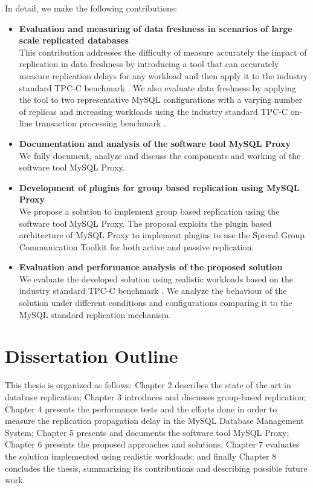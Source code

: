 In detail, we make the following contributions:

\begin{itemize}
	\item \textbf{Evaluation and measuring of data freshness in scenarios of large scale replicated databases}\\
		This contribution addresses the difficulty of measure accurately the impact of replication in data freshness by introducing a tool that can accurately measure replication delays for any workload and then apply it to the industry standard TPC-C benchmark \cite{Cou01}. We also evaluate data freshness by applying the tool to two representative MySQL configurations with a varying number of replicas and increasing workloads using the industry standard TPC-C on-line transaction processing benchmark \cite{Cou01}.
		
	\item \textbf{Documentation and analysis of the software tool MySQL Proxy}\\
		We fully document, analyze and discuss the components and working of the software tool MySQL Proxy.
		
	\item \textbf{Development of plugins for group based replication using MySQL Proxy}\\
		We propose a solution to implement group based replication using the software tool MySQL Proxy. The proposal exploits the plugin based architecture of MySQL Proxy to implement plugins to use the Spread Group Communication Toolkit for both active and passive replication.
		
	\item \textbf{Evaluation and performance analysis of the proposed solution}\\
		We evaluate the developed solution using realistic workloads based on the industry standard TPC-C benchmark \cite{Cou01}. We analyze the behaviour of the solution under different conditions and configurations comparing it to the MySQL standard replication mechanism.
\end{itemize}


\section{Dissertation Outline}

This thesis is organized as follows: Chapter 2 describes the state of the art in database replication; Chapter 3 introduces and discusses group-based replication; Chapter 4 presents the performance tests and the efforts done in order to measure the replication propagation delay in the MySQL Database Management System; Chapter 5 presents and documents the software tool MySQL Proxy; Chapter 6 presents the proposed approaches and solutions; Chapter 7 evaluates the solution implemented using realistic workloads; and finally Chapter 8 concludes the thesis, summarizing its contributions and describing possible future work. 

